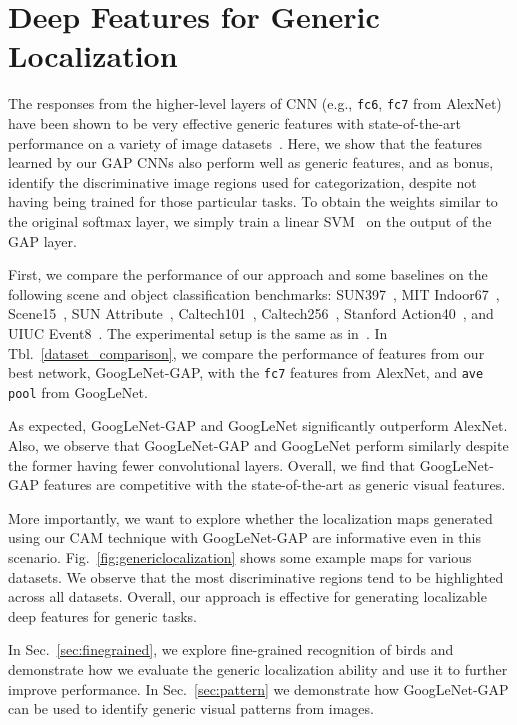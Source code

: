 \documentclass[10pt,twocolumn,letterpaper]{article}
\begin{document}
\section{Deep Features for Generic Localization}

The responses from the higher-level layers of CNN (e.g., \texttt{fc6}, \texttt{fc7} from AlexNet) have been shown to be very effective generic features with state-of-the-art performance on a variety of image datasets~\cite{donahue2014decaf,razavian2014cnn,zhou2014learning}. Here, we show that the features learned by our GAP CNNs also perform well as generic features, and as bonus, identify the discriminative image regions used for categorization, despite not having being trained for those particular tasks. To obtain the weights similar to the original softmax layer, we simply train a linear SVM~\cite{fan2008liblinear} on the output of the GAP layer.


First, we compare the performance of our approach and some baselines on the following scene and object classification benchmarks: SUN397~\cite{xiao2010sun}, MIT Indoor67~\cite{quattoni2009recognizing}, Scene15~\cite{lazebnik2006beyond}, SUN Attribute~\cite{patterson2012sun}, Caltech101~\cite{fei2007learning}, Caltech256~\cite{griffin2007caltech}, Stanford Action40~\cite{yao2011human}, and UIUC Event8~\cite{li2007and}. The experimental setup is the same as in~\cite{zhou2014learning}. In Tbl.~\ref{dataset_comparison}, we compare the performance of features from our best network, GoogLeNet-GAP, with the \texttt{fc7} features from AlexNet, and \texttt{ave pool} from GoogLeNet. 

As expected, GoogLeNet-GAP and GoogLeNet significantly outperform AlexNet. Also, we observe that GoogLeNet-GAP and GoogLeNet perform similarly despite the former having fewer convolutional layers. Overall, we find that GoogLeNet-GAP features are competitive with the state-of-the-art as generic visual features.

More importantly, we want to explore whether the localization maps generated using our CAM technique with GoogLeNet-GAP are informative even in this scenario. Fig.~\ref{fig:genericlocalization} shows some example maps for various datasets. We observe that the most discriminative regions tend to be highlighted across all datasets. Overall, our approach is effective for generating localizable deep features for generic tasks.

In Sec.~\ref{sec:finegrained}, we explore fine-grained recognition of birds and demonstrate how we evaluate the generic localization ability and use it to further improve performance. In Sec.~\ref{sec:pattern} we demonstrate how GoogLeNet-GAP can be used to identify generic visual patterns from images.
\end{document}
